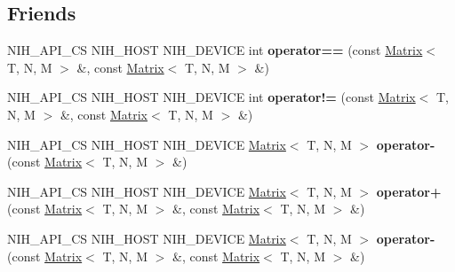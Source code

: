 \subsection*{\-Friends}
\begin{DoxyCompactItemize}
\item 
\hypertarget{group__linalg_gaa4d859c0fbdb4cf65243ef2761b7aeb7}{
\-N\-I\-H\-\_\-\-A\-P\-I\-\_\-\-C\-S \-N\-I\-H\-\_\-\-H\-O\-S\-T \-N\-I\-H\-\_\-\-D\-E\-V\-I\-C\-E int {\bfseries operator==} (const \hyperlink{structnih_1_1_matrix}{\-Matrix}$<$ \-T, \-N, \-M $>$ \&, const \hyperlink{structnih_1_1_matrix}{\-Matrix}$<$ \-T, \-N, \-M $>$ \&)}
\label{group__linalg_gaa4d859c0fbdb4cf65243ef2761b7aeb7}

\item 
\hypertarget{group__linalg_ga443999af1925e0d0e44f8441c73ff2cc}{
\-N\-I\-H\-\_\-\-A\-P\-I\-\_\-\-C\-S \-N\-I\-H\-\_\-\-H\-O\-S\-T \-N\-I\-H\-\_\-\-D\-E\-V\-I\-C\-E int {\bfseries operator!=} (const \hyperlink{structnih_1_1_matrix}{\-Matrix}$<$ \-T, \-N, \-M $>$ \&, const \hyperlink{structnih_1_1_matrix}{\-Matrix}$<$ \-T, \-N, \-M $>$ \&)}
\label{group__linalg_ga443999af1925e0d0e44f8441c73ff2cc}

\item 
\hypertarget{group__linalg_ga5c7fa91653401bed75a2c3b0b1678c18}{
\-N\-I\-H\-\_\-\-A\-P\-I\-\_\-\-C\-S \-N\-I\-H\-\_\-\-H\-O\-S\-T \-N\-I\-H\-\_\-\-D\-E\-V\-I\-C\-E \*
\hyperlink{structnih_1_1_matrix}{\-Matrix}$<$ \-T, \-N, \-M $>$ {\bfseries operator-\/} (const \hyperlink{structnih_1_1_matrix}{\-Matrix}$<$ \-T, \-N, \-M $>$ \&)}
\label{group__linalg_ga5c7fa91653401bed75a2c3b0b1678c18}

\item 
\hypertarget{group__linalg_gaa7b9b7b0244fcc9a64f4f4bb45a20aca}{
\-N\-I\-H\-\_\-\-A\-P\-I\-\_\-\-C\-S \-N\-I\-H\-\_\-\-H\-O\-S\-T \-N\-I\-H\-\_\-\-D\-E\-V\-I\-C\-E \*
\hyperlink{structnih_1_1_matrix}{\-Matrix}$<$ \-T, \-N, \-M $>$ {\bfseries operator+} (const \hyperlink{structnih_1_1_matrix}{\-Matrix}$<$ \-T, \-N, \-M $>$ \&, const \hyperlink{structnih_1_1_matrix}{\-Matrix}$<$ \-T, \-N, \-M $>$ \&)}
\label{group__linalg_gaa7b9b7b0244fcc9a64f4f4bb45a20aca}

\item 
\hypertarget{group__linalg_ga1ea26a7b60552c90fe0b1a70483a8a0b}{
\-N\-I\-H\-\_\-\-A\-P\-I\-\_\-\-C\-S \-N\-I\-H\-\_\-\-H\-O\-S\-T \-N\-I\-H\-\_\-\-D\-E\-V\-I\-C\-E \*
\hyperlink{structnih_1_1_matrix}{\-Matrix}$<$ \-T, \-N, \-M $>$ {\bfseries operator-\/} (const \hyperlink{structnih_1_1_matrix}{\-Matrix}$<$ \-T, \-N, \-M $>$ \&, const \hyperlink{structnih_1_1_matrix}{\-Matrix}$<$ \-T, \-N, \-M $>$ \&)}
\label{group__linalg_ga1ea26a7b60552c90fe0b1a70483a8a0b}


\end{DoxyCompactItemize}
